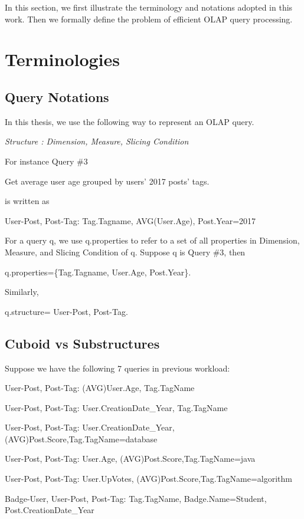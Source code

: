 In this section, we first illustrate the terminology and notations adopted in this work. Then we formally define the problem of efficient OLAP query processing. 

\section{Terminologies}

\subsection{Query Notations}


In this thesis, we use the following way to represent an OLAP query.

\textit{Structure : Dimension, Measure, Slicing Condition}
 

For instance Query \#3 

Get average user age grouped by users’ 2017 posts’ tags. 

is written as

User-Post, Post-Tag: Tag.Tagname, AVG(User.Age), Post.Year=2017

For a query q, we use q.properties to refer to a set of all properties in Dimension, Measure, and Slicing Condition of q. Suppose q is Query \#3, then

 q.properties=\{Tag.Tagname, User.Age, Post.Year\}.
 
 Similarly,
 
 q.structure= User-Post, Post-Tag.


\subsection{Cuboid vs Substructures}
Suppose we have the following 7 queries in previous workload:

User-Post, Post-Tag: (AVG)User.Age, Tag.TagName

User-Post, Post-Tag: User.CreationDate\_Year, Tag.TagName

User-Post, Post-Tag: User.CreationDate\_Year, (AVG)Post.Score,Tag.TagName=database

User-Post, Post-Tag: User.Age, (AVG)Post.Score,Tag.TagName=java

User-Post, Post-Tag: User.UpVotes, (AVG)Post.Score,Tag.TagName=algorithm

Badge-User, User-Post, Post-Tag: Tag.TagName, Badge.Name=Student, Post.CreationDate\_Year

